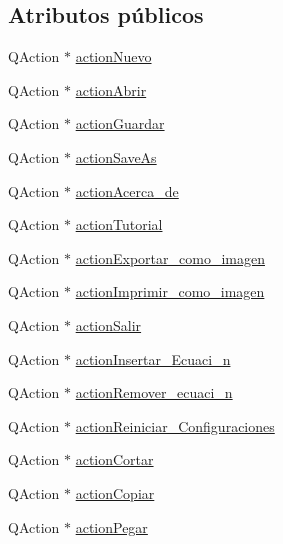 \subsection*{Atributos públicos}
\begin{DoxyCompactItemize}
\item 
Q\+Action $\ast$ \hyperlink{class_ui___main_window_a1155285b72b929e39f9f1e97da764681}{action\+Nuevo}
\item 
Q\+Action $\ast$ \hyperlink{class_ui___main_window_a74bb839484dbb0332a73731079b0441c}{action\+Abrir}
\item 
Q\+Action $\ast$ \hyperlink{class_ui___main_window_a79fcb713d759cd62a9bd7b7ce59d0144}{action\+Guardar}
\item 
Q\+Action $\ast$ \hyperlink{class_ui___main_window_ae55672d2aed40288e40d98af42c58bed}{action\+Save\+As}
\item 
Q\+Action $\ast$ \hyperlink{class_ui___main_window_ab8e04f98f8789e2c9ac0d47c0434ba66}{action\+Acerca\+\_\+de}
\item 
Q\+Action $\ast$ \hyperlink{class_ui___main_window_ac8416e6c3fb248cd0bde631f5a4a9d08}{action\+Tutorial}
\item 
Q\+Action $\ast$ \hyperlink{class_ui___main_window_a5a001d7528d56750f8da698d0d3f0d60}{action\+Exportar\+\_\+como\+\_\+imagen}
\item 
Q\+Action $\ast$ \hyperlink{class_ui___main_window_acbfc4da13027c1f1b5f0bfb74b2f24a4}{action\+Imprimir\+\_\+como\+\_\+imagen}
\item 
Q\+Action $\ast$ \hyperlink{class_ui___main_window_aa6bf8b15f3c451eb9203cb68a6bddaf4}{action\+Salir}
\item 
Q\+Action $\ast$ \hyperlink{class_ui___main_window_a67535570df46cdf0fec9995e900f4772}{action\+Insertar\+\_\+\+Ecuaci\+\_\+n}
\item 
Q\+Action $\ast$ \hyperlink{class_ui___main_window_a6cedb682d91d2914b28c8ee0567ec115}{action\+Remover\+\_\+ecuaci\+\_\+n}
\item 
Q\+Action $\ast$ \hyperlink{class_ui___main_window_a7e970ccebbd96429befec54e47be00b0}{action\+Reiniciar\+\_\+\+Configuraciones}
\item 
Q\+Action $\ast$ \hyperlink{class_ui___main_window_a594ba592f40b551a56ab090f14322501}{action\+Cortar}
\item 
Q\+Action $\ast$ \hyperlink{class_ui___main_window_aff9f9de2ce754b5a6e985fc04674e280}{action\+Copiar}
\item 
Q\+Action $\ast$ \hyperlink{class_ui___main_window_a2fe417a5ecfda27bde2d9ff1bab225f1}{action\+Pegar}

\end{DoxyCompactItemize}
